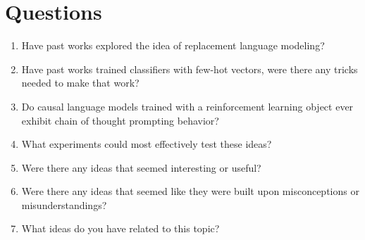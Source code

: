 \documentclass{article}
\begin{document}
\section{Questions}

\begin{enumerate}
    \item {Have past works explored the idea of replacement language modeling?}
    \item {Have past works trained classifiers with few-hot vectors, were there any tricks needed to make that work?}
    \item {Do causal language models trained with a reinforcement learning object ever exhibit chain of thought prompting behavior?}
    \item {What experiments could most effectively test these ideas?}
    \item {Were there any ideas that seemed interesting or useful?}
    \item {Were there any ideas that seemed like they were built upon misconceptions or misunderstandings?}
    \item {What ideas do you have related to this topic?}
\end{enumerate}
\end{document}
